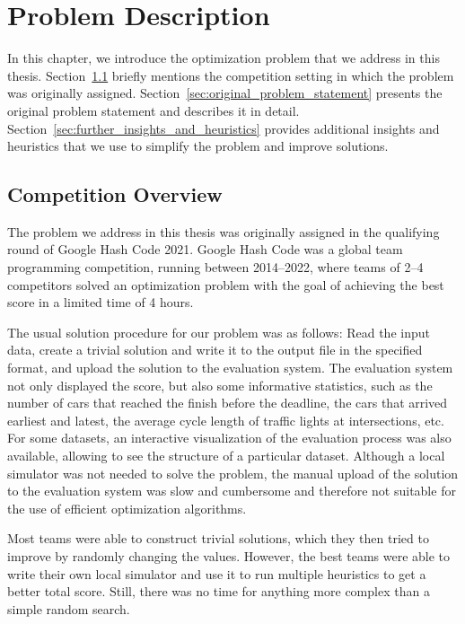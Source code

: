 \chapter{Problem Description} \label{chap:problem_description}


In this chapter, we introduce the optimization problem that we address in this thesis. Section~\ref{sec:competition_overview} briefly mentions the competition setting in which the problem was originally assigned. Section~\ref{sec:original_problem_statement} presents the original problem statement and describes it in detail. Section~\ref{sec:further_insights_and_heuristics} provides additional insights and heuristics that we use to simplify the problem and improve solutions. 

\section{Competition Overview} \label{sec:competition_overview}

The problem we address in this thesis was originally assigned in the qualifying round of Google Hash Code 2021. Google Hash Code was a global team programming competition, running between 2014--2022, where teams of 2--4 competitors solved an optimization problem with the goal of achieving the best score in a limited time of 4 hours.

The usual solution procedure for our problem was as follows: Read the input data, create a trivial solution and write it to the output file in the specified format, and upload the solution to the evaluation system. The evaluation system not only displayed the score, but also some informative statistics, such as the number of cars that reached the finish before the deadline, the cars that arrived earliest and latest, the average cycle length of traffic lights at intersections, etc.
For some datasets, an interactive visualization of the evaluation process was also available, allowing to see the structure of a particular dataset. Although a local simulator was not needed to solve the problem, the manual upload of the solution to the evaluation system was slow and cumbersome and therefore not suitable for the use of efficient optimization algorithms.

Most teams were able to construct trivial solutions, which they then tried to improve by randomly changing the values. However, the best teams were able to write their own local simulator and use it to run multiple heuristics to get a better total score. Still, there was no time for anything more complex than a simple random search.

